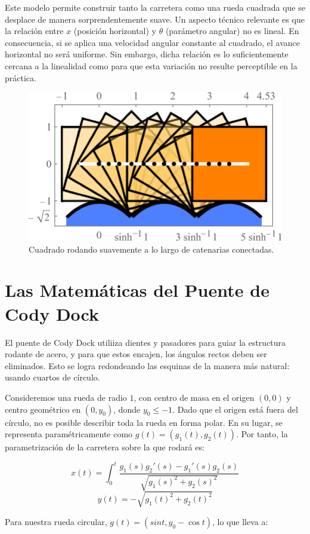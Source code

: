 \documentclass{IEEEtran}
\begin{document}
Este modelo permite construir tanto la carretera como una rueda cuadrada que se desplace de manera sorprendentemente suave. Un aspecto técnico relevante es que la relación entre $x$ (posición horizontal) y $\theta$ (parámetro angular) no es lineal. En consecuencia, si se aplica una velocidad angular constante al cuadrado, el avance horizontal no será uniforme. Sin embargo, dicha relación es lo suficientemente cercana a la linealidad como para que esta variación no resulte perceptible en la práctica.

\begin{figure}[h]
    \centering
    \includegraphics[width = 0.5 \textwidth]{Imagenes/A square rolls smoothly along linked catenaries.png}
    \caption{Cuadrado rodando suavemente a lo largo de catenarias conectadas.}
    \label{fig: A square rolls smoothly along linked catenaries}
\end{figure}

\section{Las Matemáticas del Puente de Cody Dock}

El puente de Cody Dock utiliiza dientes y pasadores para guiar la estructura rodante de acero, y para que estos encajen, los ángulos rectos deben ser eliminados. Esto se logra redondeando las esquinas de la manera más natural: usando cuartos de círculo.

Consideremos una rueda de radio $1$, con centro de masa en el origen $(0, 0)$ y centro geométrico en $(0, y_0)$, donde $y_0 \leq -1$. Dado que el origen está fuera del círculo, no es posible describir toda la rueda en forma polar. En su lugar, se representa paramétricamente como $g(t) = (g_1(t), g_2(t))$. Por tanto, la parametrización de la carretera sobre la que rodará es:

\[ x(t) = \int_{0}^{t}{\frac{g_1(s) g_2'(s) - g_1'(s) g_2(s)}{\sqrt{g_1(s)^2 + g_2(s)^2}}} \]
\[ y(t) = - \sqrt{g_1(t)^2 + g_2(t)^2} \]

Para nuestra rueda circular, $g(t) = (sin t, y_0 - \cos t)$, lo que lleva a:
\end{document}
